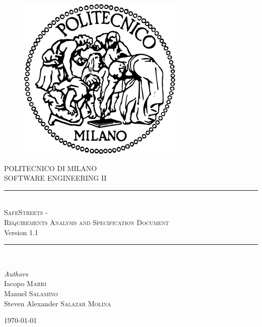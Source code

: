\documentclass[11pt,a4paper]{article}
\begin{document}
\begin{figure}[t]
    \includegraphics[scale=0.8]{Images/logo_polimi.png}
    \centering
\end{figure}

\begin{titlepage}
    \newcommand{\HRule}{\rule{\linewidth}{0.5mm}}
    \center
    \textsc{\LARGE POLITECNICO DI MILANO}\\[1.5cm]
	
	\textsc{\Large SOFTWARE ENGINEERING II}\\[0.5cm]
	
	\HRule\\[0.4cm]
	    {\huge \textsc{SafeStreets - \\Requirements Analysis and Specification Document}}\\[0.4cm]
	    Version 1.1
    \HRule\\[1.5cm]
	
	\begin{minipage}{1\textwidth}
		\begin{flushleft}
			\large
			\textit{Authors}\\
			Iacopo \textsc{Marri}\\
			Manuel \textsc{Salamino}\\
			Steven Alexander \textsc{Salazar Molina}
		\end{flushleft}
	\end{minipage}
	
	\vfill\vfill\vfill %
	
	{\large\today}
	
\end{titlepage}


\newpage

\tableofcontents






%
\end{document}
